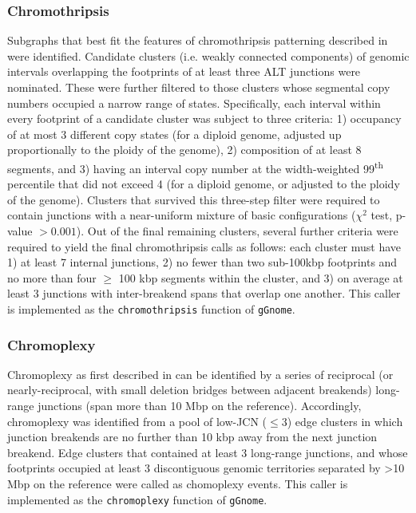 \documentclass[phd,tocprelim]{cornell}
\newcommand{\ttt}[1]{\texttt{#1}}
\begin{document}
\subsubsection*{Chromothripsis}

Subgraphs that best fit the features of chromothripsis patterning described in \cite{korbel2013} were identified. Candidate clusters (i.e. weakly connected components) of genomic intervals overlapping the footprints of at least three ALT junctions were nominated.  These were further filtered to those clusters whose segmental copy numbers occupied a narrow range of states. Specifically, each interval within every footprint of a candidate cluster was subject to three criteria: 1) occupancy of at most 3 different copy states (for a diploid genome, adjusted up proportionally to the ploidy of the genome), 2) composition of at least 8 segments, and 3) having an interval copy number at the width-weighted 99\textsuperscript{th} percentile that did not exceed 4 (for a diploid genome, or adjusted to the ploidy of the genome). Clusters that survived this three-step filter were required to contain junctions with a near-uniform mixture of basic configurations ($\chi^2$ test, p-value $> 0.001$). Out of the final remaining clusters, several further criteria were required to yield the final chromothripsis calls as follows: each cluster must have 1) at least 7 internal junctions, 2) no fewer than two sub-100kbp footprints and no more than four $\geq$ 100 kbp segments within the cluster, and 3) on average at least 3 junctions with inter-breakend spans that overlap one another. This caller is implemented as the \ttt{chromothripsis} function of \ttt{gGnome}.

\subsubsection*{Chromoplexy}

Chromoplexy as first described in \cite{baca2013} can be identified by a series of reciprocal (or nearly-reciprocal, with small deletion bridges between adjacent breakends) long-range junctions (span more than 10 Mbp on the reference). Accordingly, chromoplexy was identified from a pool of low-JCN ($\leq 3$) edge clusters in which junction breakends are no further than 10 kbp away from the next junction breakend. Edge clusters that contained at least 3 long-range junctions, and whose footprints occupied at least 3 discontiguous genomic territories separated by >10 Mbp on the reference were called as chomoplexy events. This caller is implemented as the \ttt{chromoplexy} function of \ttt{gGnome}.
\end{document}
